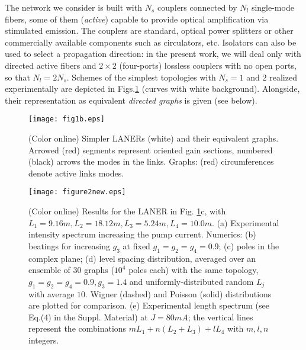 \documentclass[aps,prl,twocolumn,showpacs,amsmath,amssymb,floatfix,superscriptaddress,
]{revtex4-1}
\begin{document}
The network we consider is built with $N_s$ couplers connected by $N_l$ single-mode fibers, some of them ({\it active}) capable to provide optical amplification via stimulated emission. The couplers are standard, optical power splitters or other commercially available components such as circulators, etc. Isolators can also be used to select a propagation direction: in the present work, we will deal only with directed active fibers and $2\times2$ (four-ports) lossless couplers with no open ports, so that $N_l=2N_s$. Schemes of the simplest topologies with $N_s=1$ and $2$ realized 
experimentally are depicted in Figs.\ref{fig1b} (curves with white background).
Alongside, their representation as equivalent \textit{directed graphs} is 
given (see below).

\begin{figure}
\texttt{[image: fig1b.eps]}
\caption{(Color online) Simpler LANERs (white) and their equivalent graphs. Arrowed (red) segments represent oriented gain sections, numbered (black) arrows the modes in the links. Graphs: (red) circumferences denote active links modes.}
\label{fig1b}
\end{figure}


\begin{figure*}
\texttt{[image: figure2new.eps]}
\caption{(Color online) Results for the LANER in Fig. \ref{fig1b}c, with $L_1=9.16m,L_2=18.12m,L_3=5.24m,L_4=10.0m$. (a) Experimental intensity spectrum increasing the pump current. Numerics: (b) beatings 
for increasing $g_3$ at fixed $g_1=g_2=g_4=0.9$; (c) poles in the complex plane; (d) level spacing distribution, averaged over an ensemble of 30 graphs ($10^4$ poles each) with the same topology, $g_1=g_2=g_4=0.9,g_3=1.4$ and uniformly-distributed random $L_j$ with average $10$. Wigner (dashed) and Poisson (solid) distributions are plotted for comparison. (e) Experimental length spectrum (see Eq.(4) in the Suppl. Material) at $J=80mA$; the vertical lines represent the combinations $mL_1+n(L_2+L_3)+lL_4$ with $m,l,n$ integers.}
\label{fig2}
\end{figure*}
\end{document}
